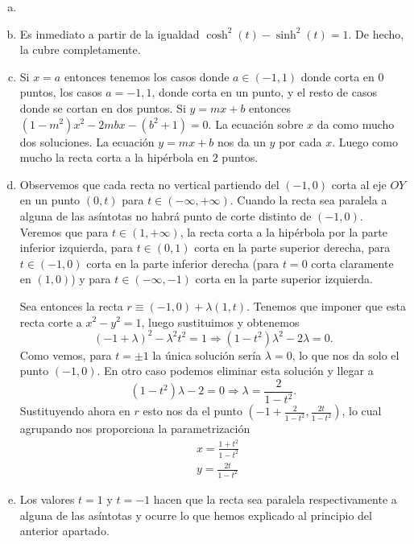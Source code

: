 \documentclass[twoside]{article}
\begin{document}
\begin{solucion}
\begin{enumerate}[a)]
\item[]
\item Es inmediato a partir de la igualdad $\cosh^2(t)
-\sinh^2(t)=1$. De hecho, la cubre completamente.
\item Si $x=a$ entonces tenemos los casos donde $a\in(-1,1)$ donde corta en 0 puntos, los casos $a=-1,1$, donde corta en un punto, y el resto de casos donde se cortan en dos puntos. Si $y=mx+b$ entonces $(1-m^2)x^2-2mbx-(b^2+1)=0$. La ecuación sobre $x$ da como mucho dos soluciones. La ecuación $y=mx+b$ nos da un $y$ por cada $x$. Luego como mucho la recta corta a la hipérbola en $2$ puntos.
\item Observemos que cada recta no vertical partiendo del $(-1,0)$ corta al eje $OY$ en un punto $(0,t)$ para $t\in(-\infty,+\infty)$. Cuando la recta sea paralela a alguna de las asíntotas no habrá punto de corte distinto de $(-1,0)$. Veremos que para $t\in(1,+\infty)$, la recta corta a la hipérbola por la parte inferior izquierda, para $t\in(0,1)$ corta en la parte superior derecha, para $t\in (-1,0)$ corta en la parte inferior derecha (para $t=0$ corta claramente en $(1,0)$) y para $t\in (-\infty,-1)$ corta en la parte superior izquierda.

Sea entonces la recta $r\equiv (-1,0)+\lambda (1,t)$. Tenemos que imponer que esta recta corte a $x^2-y^2=1$, luego sustituimos y obtenemos
\[
(-1+\lambda)^2-\lambda^2t^2=1\Rightarrow (1-t^2)\lambda^2-2\lambda=0.
\]
Como vemos, para $t=\pm 1$ la única solución sería $\lambda=0$, lo que nos da solo el punto $(-1,0)$. En otro caso podemos eliminar esta solución y llegar a 
\[
(1-t^2)\lambda-2=0\Rightarrow \lambda= \frac{2}{1-t^2}.
\]
Sustituyendo ahora en $r$ esto nos da el punto $(-1+\frac{2}{1-t^2}, \frac{2t}{1-t^2})$, lo cual agrupando nos proporciona la parametrización
\begin{align*}
&x=\frac{1+t^2}{1-t^2}\\
&y= \frac{2t}{1-t^2}
\end{align*}
\item Los valores $t=1$ y $t=-1$ hacen que la recta sea paralela respectivamente a alguna de las asíntotas y ocurre lo que hemos explicado al principio del anterior apartado.
\end{enumerate}
\end{solucion}
\end{document}
